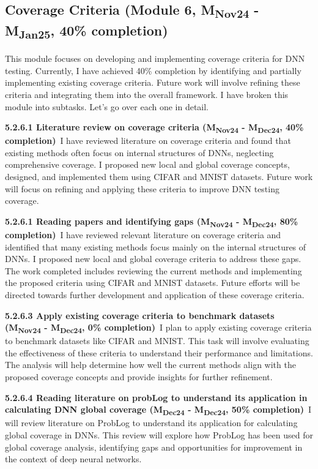\subsection{Coverage Criteria (Module 6, M\textsubscript{Nov24} - M\textsubscript{Jan25}, 40\% completion)} This module focuses on developing and implementing coverage criteria for DNN testing. Currently, I have achieved 40\% completion by identifying and partially implementing existing coverage criteria. Future work will involve refining these criteria and integrating them into the overall framework. I have broken this module into subtasks. Let's go over each one in detail.


\noindent \textbf{5.2.6.1 Literature review on coverage criteria (M\textsubscript{Nov24} - M\textsubscript{Dec24}, 40\% completion)}\ I have reviewed literature on coverage criteria and found that existing methods often focus on internal structures of DNNs, neglecting comprehensive coverage. I proposed new local and global coverage concepts, designed, and implemented them using CIFAR and MNIST datasets. Future work will focus on refining and applying these criteria to improve DNN testing coverage.


\noindent \textbf{5.2.6.1 Reading papers and identifying gaps (M\textsubscript{Nov24} - M\textsubscript{Dec24}, 80\% completion)}\ I have reviewed relevant literature on coverage criteria and identified that many existing methods focus mainly on the internal structures of DNNs. I proposed new local and global coverage criteria to address these gaps. The work completed includes reviewing the current methods and implementing the proposed criteria using CIFAR and MNIST datasets. Future efforts will be directed towards further development and application of these coverage criteria.


\noindent \textbf{5.2.6.3 Apply existing coverage criteria to benchmark datasets (M\textsubscript{Nov24} - M\textsubscript{Dec24}, 0\% completion)}\ I plan to apply existing coverage criteria to benchmark datasets like CIFAR and MNIST. This task will involve evaluating the effectiveness of these criteria to understand their performance and limitations. The analysis will help determine how well the current methods align with the proposed coverage concepts and provide insights for further refinement.

\noindent \textbf{5.2.6.4 Reading literature on probLog to understand its application in calculating DNN global coverage (M\textsubscript{Dec24} - M\textsubscript{Dec24}, 50\% completion)}\ I will review literature on ProbLog to understand its application for calculating global coverage in DNNs. This review will explore how ProbLog has been used for global coverage analysis, identifying gaps and opportunities for improvement in the context of deep neural networks.


